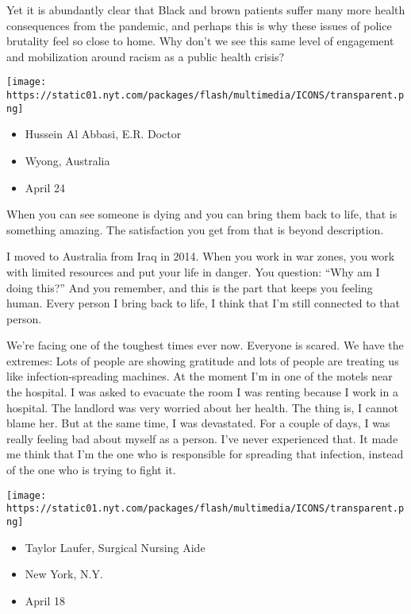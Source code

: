Yet it is abundantly clear that Black and brown patients suffer many
more health consequences from the pandemic, and perhaps this is why
these issues of police brutality feel so close to home. Why don't we see
this same level of engagement and mobilization around racism as a public
health crisis?

\texttt{[image: https://static01.nyt.com/packages/flash/multimedia/ICONS/transparent.png]}

\begin{itemize}
\tightlist
\item
  Hussein Al Abbasi, E.R. Doctor
\item
  Wyong, Australia
\item
  April 24
\end{itemize}

When you can see someone is dying and you can bring them back to life,
that is something amazing. The satisfaction you get from that is beyond
description.

I moved to Australia from Iraq in 2014. When you work in war zones, you
work with limited resources and put your life in danger. You question:
``Why am I doing this?'' And you remember, and this is the part that
keeps you feeling human. Every person I bring back to life, I think that
I'm still connected to that person.

We're facing one of the toughest times ever now. Everyone is scared. We
have the extremes: Lots of people are showing gratitude and lots of
people are treating us like infection-spreading machines. At the moment
I'm in one of the motels near the hospital. I was asked to evacuate the
room I was renting because I work in a hospital. The landlord was very
worried about her health. The thing is, I cannot blame her. But at the
same time, I was devastated. For a couple of days, I was really feeling
bad about myself as a person. I've never experienced that. It made me
think that I'm the one who is responsible for spreading that infection,
instead of the one who is trying to fight it.

\texttt{[image: https://static01.nyt.com/packages/flash/multimedia/ICONS/transparent.png]}

\begin{itemize}
\tightlist
\item
  Taylor Laufer, Surgical Nursing Aide
\item
  New York, N.Y.
\item
  April 18
\end{itemize}

